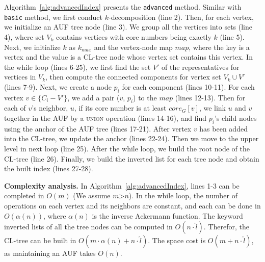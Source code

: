 Algorithm~\ref{alg:advancedIndex} presents the {\tt advanced} method.
Similar with {\tt basic} method, we first conduct $k$-decomposition (line 2).
Then, for each vertex, we initialize an AUF tree node (line 3).
We group all the vertices into sets (line 4),
where set $V_k$ contains vertices with core numbers being exactly $k$ (line 5).
Next, we initialize $k$ as $k_{max}$ and the vertex-node map $map$,
where the key is a vertex and the value is a CL-tree node whose vertex set contains this vertex.
In the while loop (lines 6-25),
we first find the set $V'$ of the representatives for vertices in $V_k$,
then compute the connected components for vertex set $V_k\cup V'$ (lines 7-9).
Next, we create a node $p_i$ for each component (lines 10-11).
For each vertex $v\in \{C_i-V'\}$, we add a pair ($v$, $p_i$) to the $map$ (lines 12-13).
Then for each of $v$'s neighbor, $u$, if its core number is at least $core_G[v]$,
we link $u$ and $v$ together in the AUF by a \textsc{union} operation (lines 14-16),
and find $p_i$'s child nodes using the anchor of the AUF tree (lines 17-21).
After vertex $v$ has been added into the CL-tree, we update the anchor (lines 22-24).
Then we move to the upper level in next loop (line 25).
After the while loop, we build the root node of the CL-tree (line 26).
Finally, we build the inverted list for each tree node and obtain the built index (lines 27-28).


\textbf{Complexity analysis.}
In Algorithm~\ref{alg:advancedIndex}, lines 1-3 can be completed in $O(m)$ (We assume $m$>$n$).
In the while loop, the number of operations on each vertex and its neighbors are constant,
and each can be done in $O(\alpha(n))$, where $\alpha(n)$ is the inverse Ackermann function.
The keyword inverted lists of all the tree nodes can be computed in $O(n\cdot {\widehat l})$.
Therefor, the CL-tree can be built in $O(m\cdot \alpha(n)+n\cdot{\widehat l})$.
The space cost is $O(m+n\cdot{\widehat l})$, as maintaining an AUF takes $O(n)$.

